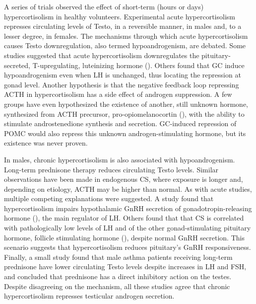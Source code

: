 \documentclass[12pt,english]{report}\usepackage[]{graphicx}\usepackage[]{color}
\begin{document}
A series of trials observed the effect of short-term (hours or days)
hypercortisolism in healthy volunteers. Experimental acute hypercortisolism
represses circulating levels of Testo, in a reversible manner, in
males and, to a lesser degree, in females\citep{cumming1983acute,fassnacht2003adrenal}.
The mechanisms through which acute hypercortisolism causes Testo downregulation,
also termed hypoandrogenism, are debated. Some studies suggested that
acute hypercortisolism downregulates the pituitary-secreted, T-upregulating,
luteinizing hormone ()\citep{kamischke1998testosterone,cortes-gallegos1975effect,kuhn1986fonction}.
Others found that GC induce hypoandrogenism even when LH is unchanged,
thus locating the repression at gonad level\citep{schaison1979study}.
Another hypothesis is that the negative feedback loop repressing ACTH
in hypercortisolism has a side effect of androgen suppression\citep{yehuda2004acth}.
A few groups have even hypothesized the existence of another, still
unknown hormone, synthesized from ACTH precursor, pro-opiomelanocortin
(), with the ability to
stimulate androstenedione synthesis and secretion\citep{barbetta2001androgen,cunningham1994dissociation}.
GC-induced repression of POMC would also repress this unknown androgen-stimulating
hormone, but its existence was never proven.

In males, chronic hypercortisolism is also associated with hypoandrogenism.
Long-term prednisone therapy reduces circulating Testo levels\citep{martens1994decreased}.
Similar observations have been made in endogenous CS, where exposure
is longer and, depending on etiology, ACTH may be higher than normal.
As with acute studies, multiple competing explanations were suggested.
A study found that hypercortisolism impairs hypothalamic GnRH secretion
of gonadotropin-releasing hormone (),
the main regulator of LH\citep{lado-abeal1998menstrual}. Others found
that that CS is correlated with pathologically low levels of LH and
of the other gonad-stimulating pituitary hormone, follicle stimulating
hormone (), despite
normal GnRH secretion\citep{luton1977reversible,boccuzzi1975effect}.
This scenario suggests that hypercortisolism reduces pituitary's GnRH
responsiveness. Finally, a small study found that male asthma patients
receiving long-term prednisone have lower circulating Testo levels
despite increases in LH and FSH, and concluded that prednisone has
a direct inhibitory action on the testes\citep{reid1985plasma}. Despite
disagreeing on the mechanism, all these studies agree that chronic
hypercortisolism represses testicular androgen secretion.
\end{document}
